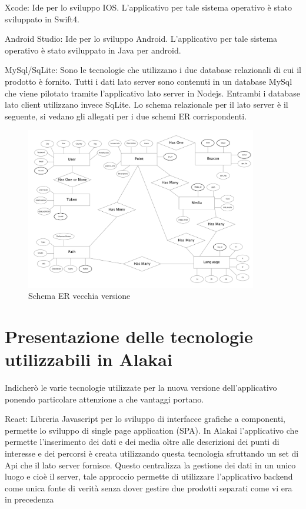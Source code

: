 	Xcode: Ide per lo sviluppo IOS. L’applicativo per tale sistema operativo è stato sviluppato in Swift4.\vspace{5mm}

	Android Studio: Ide per lo sviluppo Android. L’applicativo per tale sistema operativo è stato sviluppato in Java per android.\vspace{5mm}

	MySql/SqLite: Sono le tecnologie che utilizzano i due database relazionali di cui il prodotto è fornito. Tutti i dati lato server sono contenuti in un database MySql che viene pilotato tramite l’applicativo lato server in Nodejs. Entrambi i database lato client utilizzano invece SqLite. Lo schema relazionale per il lato server è il seguente, si vedano gli allegati per i due schemi ER corrispondenti.\vspace{5mm}
	
\begin{figure}[h]
\centering
\includegraphics[width=0.9\textwidth]{images/erOld.png}
\caption{Schema ER vecchia versione}
\end{figure}
\vspace{5mm}
	
\section{Presentazione delle tecnologie utilizzabili in Alakai}\vspace{5mm}
Indicherò le varie tecnologie utilizzate per la nuova versione dell'applicativo ponendo particolare attenzione a che vantaggi portano.\vspace{5mm}

React: Libreria Javascript per lo sviluppo di interfacce grafiche a componenti, permette lo sviluppo di single page application (SPA). In Alakai l’applicativo che permette l’inserimento dei dati e dei media oltre alle descrizioni dei punti di interesse e dei percorsi è creata utilizzando questa tecnologia sfruttando un set di Api che il lato server fornisce. Questo centralizza la gestione dei dati in un unico luogo e cioè il server, tale approccio permette di utilizzare l'applicativo backend come unica fonte di verità senza dover gestire due prodotti separati come vi era in precedenza\vspace{5mm}

